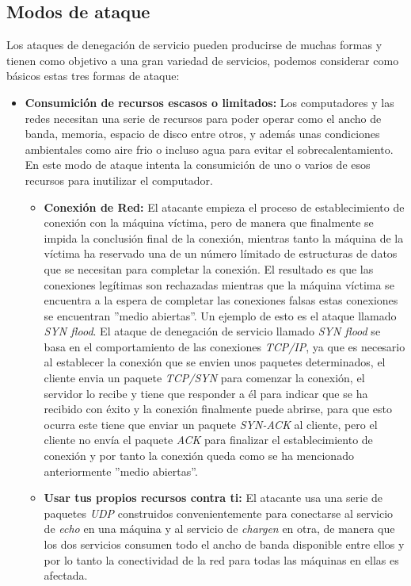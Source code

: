 \documentclass[a4paper, 10pt]{article} %
\begin{document}
\subsection{Modos de ataque}
\cite{9} Los ataques de denegación de servicio pueden producirse de muchas formas y tienen como objetivo a una gran variedad de servicios, podemos considerar como básicos estas tres formas de ataque:
\begin{itemize}
\item \textbf{Consumición de recursos escasos o limitados:} Los computadores y las redes necesitan una serie de recursos para poder operar como el ancho de banda, memoria, espacio de disco entre otros, y además unas condiciones ambientales como aire frio o incluso agua para evitar el sobrecalentamiento. En este modo de ataque intenta la consumición de uno o varios de esos recursos para inutilizar el computador.
\begin{itemize}
\item \textbf{Conexión de Red:} El atacante empieza el proceso de establecimiento de conexión con la máquina víctima, pero de manera que finalmente se impida la conclusión final de la conexión, mientras tanto la máquina de la víctima ha reservado una de un número límitado de estructuras de datos que se necesitan para completar la conexión. El resultado es que las conexiones legítimas son rechazadas mientras que la máquina víctima se encuentra a la espera de completar las conexiones falsas estas conexiones se encuentran ''medio abiertas''. Un ejemplo de esto es el ataque llamado \textit{SYN flood}. \cite{12} El ataque de denegación de servicio llamado \textit{SYN flood} se basa en el comportamiento de las conexiones \textit{TCP/IP}, ya que es necesario al establecer la conexión que se envien unos paquetes determinados, el cliente envia un paquete \textit{TCP/SYN} para comenzar la conexión, el servidor lo recibe y tiene que responder a él para indicar que se ha recibido con éxito y la conexión finalmente puede abrirse, para que esto ocurra este tiene que enviar un paquete \textit{SYN-ACK} al cliente, pero el cliente no envía el paquete \textit{ACK} para finalizar el establecimiento de conexión y por tanto la conexión queda como se ha mencionado anteriormente ''medio abiertas''.
\item \textbf{Usar tus propios recursos contra ti:} El atacante usa una serie de paquetes \textit{UDP} construidos convenientemente para conectarse al servicio de \textit{echo} en una máquina y al servicio de \textit{chargen} en otra, de manera que los dos servicios consumen todo el ancho de banda disponible entre ellos y por lo tanto la conectividad de la red para todas las máquinas en ellas es afectada.

\end{itemize}
\end{itemize}
\end{document}
